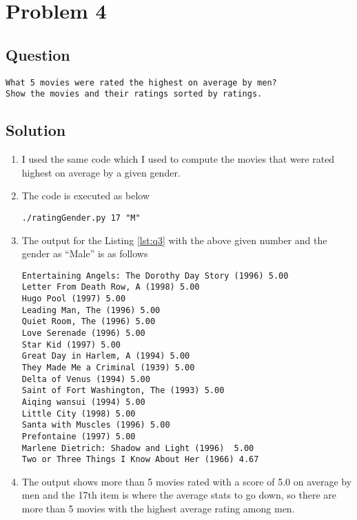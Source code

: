 \section{Problem 4}
\label{part4}
\subsection*{Question}
\begingroup
\begin{verbatim}
What 5 movies were rated the highest on average by men?
Show the movies and their ratings sorted by ratings.
\end{verbatim}
\subsection{Solution}
\begin{enumerate}
\item I used the same code which I used to compute the movies that were rated highest on average by a given gender. 
\item The code is executed as below 
\begin{lstlisting}[frame=single]
 ./ratingGender.py 17 "M"
\end{lstlisting}
\item The output for the Listing \ref{lst:q3} with the above given number and the gender as ``Male'' is as follows
\begin{lstlisting}[frame=single]
Entertaining Angels: The Dorothy Day Story (1996) 5.00
Letter From Death Row, A (1998) 5.00
Hugo Pool (1997) 5.00
Leading Man, The (1996) 5.00
Quiet Room, The (1996) 5.00
Love Serenade (1996) 5.00
Star Kid (1997) 5.00
Great Day in Harlem, A (1994) 5.00
They Made Me a Criminal (1939) 5.00
Delta of Venus (1994) 5.00
Saint of Fort Washington, The (1993) 5.00
Aiqing wansui (1994) 5.00
Little City (1998) 5.00
Santa with Muscles (1996) 5.00
Prefontaine (1997) 5.00
Marlene Dietrich: Shadow and Light (1996)  5.00
Two or Three Things I Know About Her (1966) 4.67
\end{lstlisting}
\item The output shows more than 5 movies rated with a score of 5.0 on average by men and the 17th item is where the average stats to go down, so there are more than 5 movies with the highest average rating among men.
\end{enumerate}
\newpage



